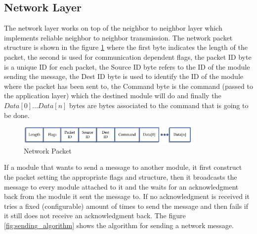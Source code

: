 \subsection{Network Layer}

The network layer works on top of the neighbor to neighbor layer which implements reliable neighbor to neighbor transmission. The network packet structure is shown in the figure \ref{fig:network_packet} where the first byte indicates the length of the packet, the second is used for communication dependent flags, the packet ID byte is a unique ID for each packet, the Source ID byte refers to the ID of the module sending the message, the Dest ID byte is used to identify the ID of the module where the packet has been sent to, the Command byte is the command (passed to the application layer) which the destined module will do and finally the $Data[0] \ldots Data[n]$ bytes are bytes associated to the command that is going to be done.

\begin{figure}[htb]
\centering
\includegraphics[width=0.8\textwidth]{figures/network_packet.png}
\caption{Network Packet}
\label{fig:network_packet}
\end{figure}

If a module that wants to send a message to another module, it first construct the packet setting the appropriate flags and structure, then it broadcasts the message to every module attached to it and the waits for an acknowledgment back from the module it sent the message to. If no acknowledgment is received it tries a fixed (configurable) amount of times to send the message and then fails if it still does not receive an acknowledgment back. The figure \ref{fig:sending_algorithm} shows the algorithm for sending a network message.

